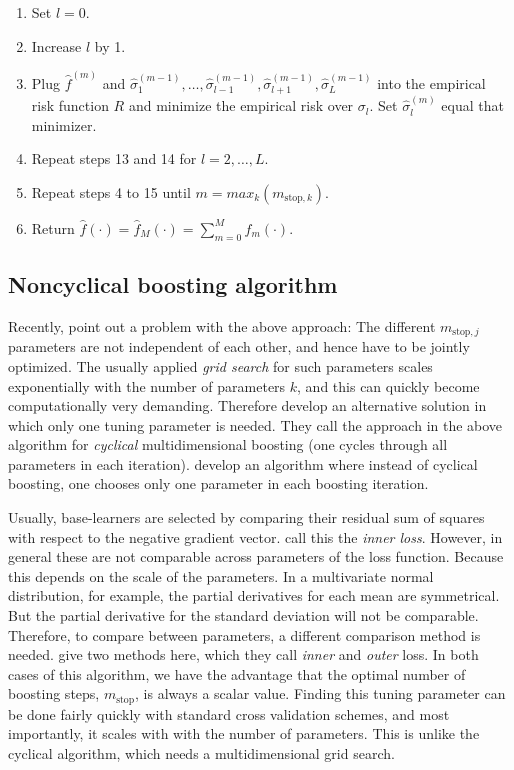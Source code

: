 \begin{algorithm}
\begin{enumerate}
    \item Set $l=0$.
    \item Increase $l$ by 1.
    \item Plug $\hat{f}^{(m)}$ and $\hat{\sigma}_1^{(m-1)},\ldots,\hat{\sigma}_{l-1}^{(m-1)},\hat{\sigma}_{l+1}^{(m-1)},\hat{\sigma}_{L}^{(m-1)}$ into the empirical risk function $R$ and minimize the empirical risk over $\sigma_l$. Set $\hat{\sigma}_l^{(m)}$ equal that minimizer.
    \item Repeat steps 13 and 14 for $l=2,\ldots,L$.
    \item Repeat steps 4 to 15 until $m=max_k(m_{\text{stop},k})$.
    \item Return $\hat{f}(\cdot)=\hat{f}_M(\cdot)=\sum_{m=0}^Mf_m(\cdot)$.
\end{enumerate}
\end{algorithm}

\subsection{Noncyclical boosting algorithm}
Recently, \citet{thomas2018} point out a problem with the above approach: The different $m_{\text{stop},j}$ parameters are not independent of each other, and hence have to be jointly optimized. The usually applied \textit{grid search} for such parameters scales exponentially with the number of parameters $k$, and this can quickly become computationally very demanding. Therefore \citet{thomas2018} develop an alternative solution in which only one tuning parameter is needed. They call the approach in the above algorithm for \textit{cyclical} multidimensional boosting (one cycles through all parameters in each iteration). \citet{thomas2018} develop an algorithm where instead of cyclical boosting, one chooses only one parameter in each boosting iteration.

Usually, base-learners are selected by comparing their residual sum of squares with respect to the negative gradient vector. \citet{thomas2018} call this the \textit{inner loss}. However, in general these are not comparable across parameters of the loss function. Because this depends on the scale of the parameters. In a multivariate normal distribution, for example, the partial derivatives for each mean are symmetrical. But the partial derivative for the standard deviation will not be comparable. Therefore, to compare between parameters, a different comparison method is needed. \citet{thomas2018} give two methods here, which they call \textit{inner} and \textit{outer} loss. In both cases of this algorithm, we have the advantage that the optimal number of boosting steps, $m_{\text{stop}}$, is always a scalar value. Finding this tuning parameter can be done fairly quickly with standard cross validation schemes, and most importantly, it scales with with the number of parameters. This is unlike the cyclical algorithm, which needs a multidimensional grid search.

